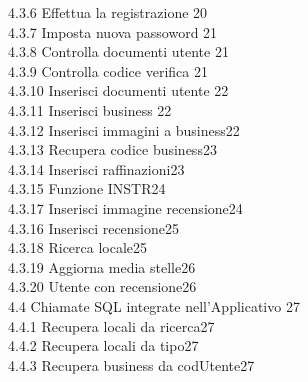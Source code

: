 \documentclass[a4paper,12pt]{article}
\begin{document}
\begin{flushleft}
\hspace{+3cm}\normalsize 4.3.6 Effettua la registrazione \hfill 20\\
\hspace{+3cm}\normalsize 4.3.7 Imposta nuova passoword \hfill 21\\
\hspace{+3cm}\normalsize 4.3.8 Controlla documenti utente \hfill 21\\
\hspace{+3cm}\normalsize 4.3.9 Controlla codice verifica \hfill 21\\
\hspace{+3cm}\normalsize 4.3.10 Inserisci documenti utente \hfill 22\\
\hspace{+3cm}\normalsize 4.3.11 Inserisci business \hfill 22\\
\hspace{+3cm}\normalsize 4.3.12 Inserisci immagini a business\hfill 22\\
\hspace{+3cm}\normalsize 4.3.13 Recupera codice business\hfill 23\\
\hspace{+3cm}\normalsize 4.3.14 Inserisci raffinazioni\hfill 23\\
\hspace{+3cm}\normalsize 4.3.15 Funzione INSTR\hfill 24\\
\hspace{+3cm}\normalsize 4.3.17 Inserisci immagine recensione\hfill 24\\
\hspace{+3cm}\normalsize 4.3.16 Inserisci recensione\hfill 25\\
\hspace{+3cm}\normalsize 4.3.18 Ricerca locale\hfill 25\\
\hspace{+3cm}\normalsize 4.3.19 Aggiorna media stelle\hfill 26\\
\hspace{+3cm}\normalsize 4.3.20 Utente con recensione\hfill 26\\
\hspace{+2cm}\large 4.4 Chiamate SQL integrate nell'Applicativo \hfill 27\\
\hspace{+3cm}\normalsize 4.4.1 Recupera locali da ricerca\hfill 27\\
\hspace{+3cm}\normalsize 4.4.2 Recupera locali da tipo\hfill 27\\
\hspace{+3cm}\normalsize 4.4.3 Recupera business da codUtente\hfill 27\\

\end{flushleft}
\newpage
\end{document}
